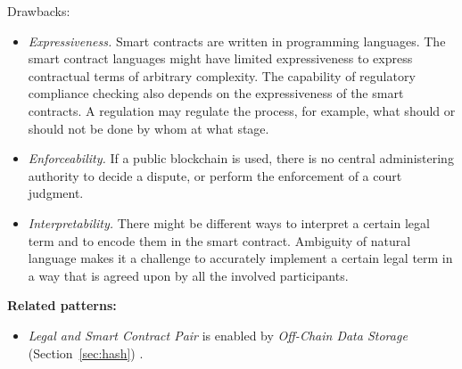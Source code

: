 Drawbacks: 
\begin{itemize}
   \item \textit{Expressiveness.} Smart contracts are written in programming languages. The smart contract languages might have limited expressiveness to express contractual terms of arbitrary complexity. The capability of regulatory compliance checking also depends on the expressiveness of the smart contracts. A regulation may regulate the process, for example, what should or should not be done by whom at what stage. %
   \item \textit{Enforceability.} If a public blockchain is used, there is no central administering authority to decide a dispute, or perform the enforcement of a court judgment. 
   \item \textit{Interpretability.} There might be different ways to interpret a certain legal term and to encode them in the smart contract. Ambiguity of natural language makes it a challenge to accurately implement a certain legal term in a way that is agreed upon by all the involved participants.
\end{itemize}



\vspace{0.5em}\noindent \textbf{Related patterns:} 
\begin{itemize}
    \item \textit{Legal and Smart Contract Pair} is enabled by \textit{Off-Chain Data Storage} (Section~\ref{sec:hash}) .
\end{itemize}


